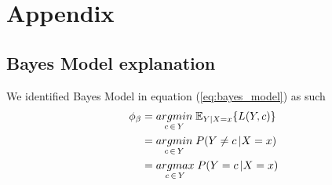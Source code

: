 \section{Appendix}
\subsection{Bayes Model explanation}
\label{app:bayes_model}
We identified Bayes Model in equation (\ref{eq:bayes_model}) as such
\begin{align}
\phi_{\beta} & = \underset{c \,\in\, Y}{argmin} \; \mathbb{E}_{Y|X=x}\{L(Y,c) \} \notag\\
			 & = \underset{c \,\in\, Y}{argmin} \; P(Y \neq c \,| X = x) \notag\\
			 & = \underset{c \,\in\, Y}{argmax} \; P(Y = c \,| X = x)\notag
\end{align}

